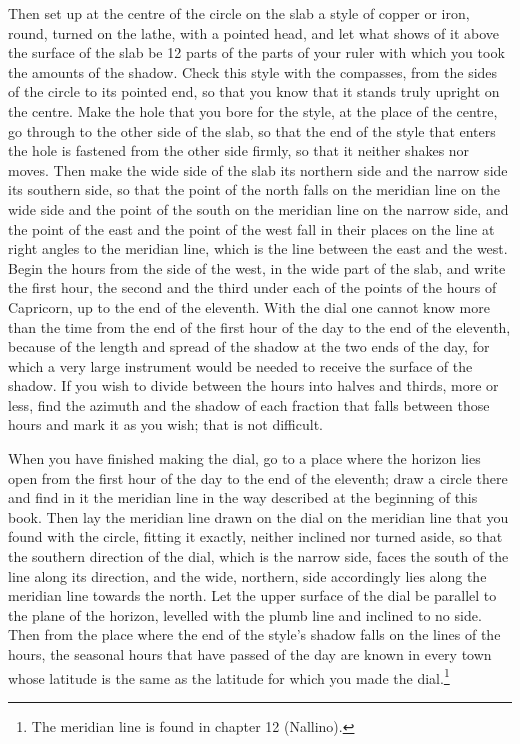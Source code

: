 \documentclass[11pt]{article}
\newcommand{\ArPage}[1]{\marginpar{\footnotesize\color{gray}Ar.\,p.\,#1}}
\begin{document}
\par \ArPage{205}Then set up at the centre of the circle on the slab a style of copper or iron, round, turned on the lathe, with a pointed head, and let what shows of it above the surface of the slab be 12 parts of the parts of your ruler with which you took the amounts of the shadow. Check this style with the compasses, from the sides of the circle to its pointed end, so that you know that it stands truly upright on the centre. Make the hole that you bore for the style, at the place of the centre, go through to the other side of the slab, so that the end of the style that enters the hole is fastened from the other side firmly, so that it neither shakes nor moves. Then make the wide side of the slab its northern side and the narrow side its southern side, so that the point of the north falls on the meridian line on the wide side and the point of the south on the meridian line on the narrow side, and the point of the east and the point of the west fall in their places on the line at right angles to the meridian line, which is the line between the east and the west. Begin the hours from the side of the west, in the wide part of the slab, and write the first hour, the second and the third under each of the points of the hours of Capricorn, up to the end of the eleventh. With the dial one cannot know more than the time from the end of the first hour of the day to the end of the eleventh, because of the length and spread of the shadow at the two ends of the day, for which a very large instrument would be needed to receive the surface of the shadow. If you wish to divide between the hours into halves and thirds, more or less, find the azimuth and the shadow of each fraction that falls between those hours and mark it as you wish; that is not difficult.\par
\par When you have finished making the dial, go to a place where the horizon lies open from the first hour of the day to the end of the eleventh; draw a circle there and find in it the meridian line in the way described at the beginning of this book. Then lay the meridian line drawn on the dial on the meridian line that you found with the circle, fitting it exactly, neither inclined nor turned aside, so that the southern direction of the dial, which is the narrow side, faces the south of the line along its direction, and the wide, northern, side accordingly lies along the meridian line towards the north. Let the upper surface of the dial be parallel to the plane of the horizon, levelled with the plumb line and inclined to no side. Then from the place where the end of the style's shadow falls on the lines of the hours, the seasonal hours that have passed of the day are known in every town whose latitude is the same as the latitude for which you made the dial.\footnote{The meridian line is found in chapter 12 (Nallino).}\par
\end{document}
